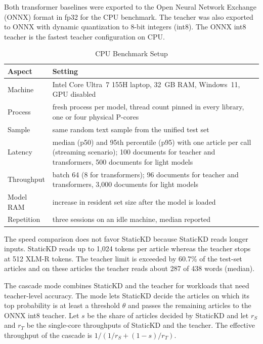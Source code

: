 \documentclass{ieeeaccess}
\begin{document}
Both transformer baselines were exported to the Open Neural Network Exchange (ONNX) format in fp32 for the CPU benchmark. The teacher was also exported to ONNX with dynamic quantization to 8-bit integers (int8). The ONNX int8 teacher is the fastest teacher configuration on CPU.

\begin{table}[!t]
\caption{CPU Benchmark Setup}
\label{tab:effsetup}
\centering
\footnotesize
\setlength{\tabcolsep}{3pt}
\begin{tabular}{@{}p{}p{}@{}}
\toprule
Aspect & Setting \\
\midrule
Machine & Intel Core Ultra~7 155H laptop, 32~GB RAM, Windows~11, GPU disabled \\
Process & fresh process per model, thread count pinned in every library, one or four physical P-cores \\
Sample & same random text sample from the unified test set \\
Latency & median (p50) and 95th percentile (p95) with one article per call (streaming scenario); 100 documents for teacher and transformers, 500 documents for light models \\
Throughput & batch 64 (8 for transformers); 96 documents for teacher and transformers, 3,000 documents for light models \\
Model RAM & increase in resident set size after the model is loaded \\
Repetition & three sessions on an idle machine, median reported \\
\bottomrule
\end{tabular}
\end{table}

The speed comparison does not favor StaticKD because StaticKD reads longer inputs. StaticKD reads up to 1,024 tokens per article whereas the teacher stops at 512 XLM-R tokens. The teacher limit is exceeded by 60.7\% of the test-set articles and on these articles the teacher reads about 287 of 438 words (median).

The cascade mode combines StaticKD and the teacher for workloads that need teacher-level accuracy. The mode lets StaticKD decide the articles on which its top probability is at least a threshold $\theta$ and passes the remaining articles to the ONNX int8 teacher. Let $s$ be the share of articles decided by StaticKD and let $r_S$ and $r_T$ be the single-core throughputs of StaticKD and the teacher. The effective throughput of the cascade is $1/(1/r_S+(1-s)/r_T)$.
\end{document}
